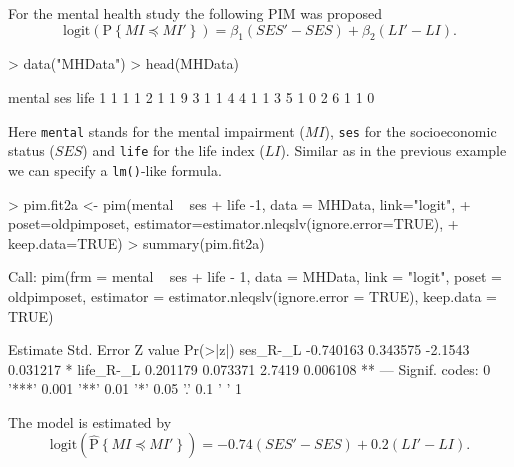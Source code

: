 \documentclass[12pt]{article}
\newcommand{\prob}[1]{\text{P}\left\{#1\right\}}
\newcommand{\hatprob}[1]{\hat{\text{P}}\left\{#1\right\}}
\newcommand{\leqs}{\preccurlyeq}
\begin{document}
For the mental health study the following PIM was proposed
\begin{equation}\label{pim.mhs}
\text{logit}\left(\prob{MI \leqs MI'} \right) = \beta_1 (SES' - SES) + \beta_2 (LI' - LI). 
\end{equation}
\begin{Schunk}
\begin{Sinput}
> data("MHData")
> head(MHData)
\end{Sinput}
\begin{Soutput}
  mental ses life
1      1   1    1
2      1   1    9
3      1   1    4
4      1   1    3
5      1   0    2
6      1   1    0
\end{Soutput}
\end{Schunk}
Here \verb|mental| stands for the mental impairment ($MI$), \verb|ses| for the socioeconomic status ($SES$) and \verb|life| for the life index ($LI$). Similar as in the previous example we can specify a \texttt{lm()}-like formula. 
\begin{Schunk}
\begin{Sinput}
> pim.fit2a <- pim(mental ~ ses + life -1, data = MHData, link="logit", 
+ 								 poset=oldpimposet, estimator=estimator.nleqslv(ignore.error=TRUE), 
+ 								 keep.data=TRUE)
> summary(pim.fit2a)
\end{Sinput}
\begin{Soutput}
Call:
pim(frm = mental ~ ses + life - 1, data = MHData, link = "logit", 
    poset = oldpimposet, estimator = estimator.nleqslv(ignore.error = TRUE), 
    keep.data = TRUE)

           Estimate Std. Error Z value Pr(>|z|)   
ses_R-_L  -0.740163   0.343575 -2.1543 0.031217 * 
life_R-_L  0.201179   0.073371  2.7419 0.006108 **
---
Signif. codes:  0 '***' 0.001 '**' 0.01 '*' 0.05 '.' 0.1 ' ' 1 
\end{Soutput}
\end{Schunk}
The model is estimated by
\[
\text{logit}\left(\hatprob{MI \leqs MI'} \right) = -0.74 (SES' - SES) + 0.2 (LI' - LI). 
\]
\end{document}
